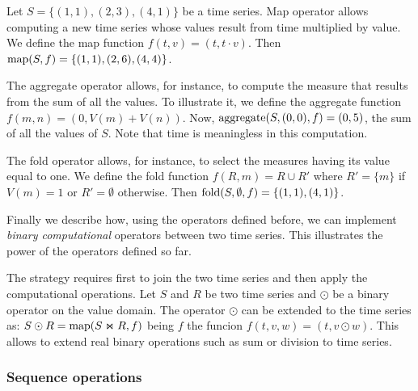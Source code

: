 


\begin{example}
\label{ex:computational-operators}
Let $S=\{(1,1),(2,3),(4,1)\}$ be a time series.  Map operator allows
computing a new time series whose values result from time multiplied
by value.  We define the map function $f(t,v)=(t,t\cdot v)$. Then
$\operatorname*{map}(S,f)=\{(1,1),(2,6),(4,4)\}$.  
%


The aggregate operator allows, for instance, to compute the measure
that results from the sum of all the values.  To illustrate it, we
define the aggregate function $f(m,n)=(0,V(m)+V(n))$. Now,
$\operatorname*{aggregate}(S,(0,0),f) = (0,5)$, the sum of all the values of $S$. Note that
time is meaningless in this computation.

The fold operator allows, for instance, to select the measures having
its value equal to one.  We define the fold function $f(R,m)=R\cup R'$
where $R'=\{m\}$ if $V(m)=1$ or $R'=\emptyset$ otherwise. Then
$\operatorname*{fold}(S,\emptyset,f)=\{(1,1),(4,1)\}$.
\end{example}


Finally we describe how, using the operators defined before, we can
implement \emph{binary computational} operators between two time
series. This illustrates the power of the operators defined so far.
%

The strategy requires first to join the two time series and then
apply the computational operations. 
%
Let $S$ and $R$ be two time series and $\odot$ be a binary operator on
the value domain. The operator $\odot$ can be extended to the time
series as:
%
$S\odot R=\operatorname*{map}(S\Join R, f)$ being $f$ the funcion
$f(t,v,w)=(t,v\odot w)$.
%
This allows to extend real binary operations such as sum or division
to time series.  


\subsubsection{Sequence operations}

